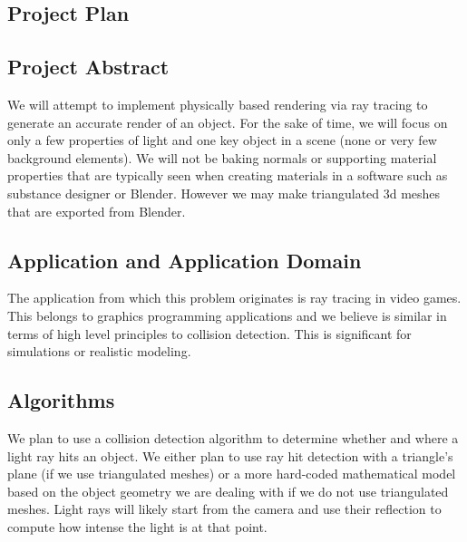 \documentclass[12pt]{article}
\begin{document}
\begin{center}
    \section*{Project Plan}
\end{center}


\subsection*{Project Abstract}


We will attempt to implement physically based rendering via ray tracing to
generate an accurate render of an object. For the sake of time, we will focus
on only a few properties of light and one key object in a scene (none or very
few background elements). We will not be baking normals or supporting material
properties that are typically seen when creating materials in a software such
as substance designer or Blender. However we may make triangulated 3d meshes
that are exported from Blender.

\subsection*{Application and Application Domain}
The application from which this problem originates is ray tracing in video
games. This belongs to graphics programming applications and we believe is
similar in terms of high level principles to collision detection. This is
significant for simulations or realistic modeling.


\subsection*{Algorithms}
We plan to use a collision detection algorithm to determine whether and where a
light ray hits an object. We either plan to use ray hit detection with a
triangle’s plane (if we use triangulated meshes) or a more hard-coded
mathematical model based on the object geometry we are dealing with if we do
not use triangulated meshes. Light rays will likely start from the camera and
use their reflection to compute how intense the light is at that point.
\end{document}
